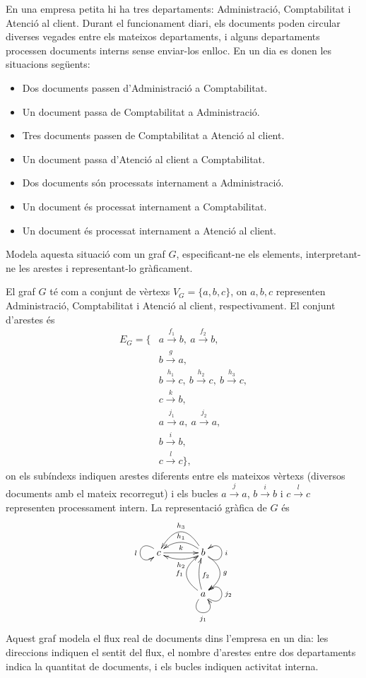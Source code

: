 \begin{exemple}
En una empresa petita hi ha tres departaments: Administració, Comptabilitat i Atenció al client. Durant el funcionament diari, els documents poden circular diverses vegades entre els mateixos departaments, i alguns departaments processen documents interns sense enviar-los enlloc. En un dia es donen les situacions següents:
\begin{itemize}
\item Dos documents passen d'Administració a Comptabilitat.
\item Un document passa de Comptabilitat a Administració.
\item Tres documents passen de Comptabilitat a Atenció al client.
\item Un document passa d'Atenció al client a Comptabilitat.
\item Dos documents són processats internament a Administració.
\item Un document és processat internament a Comptabilitat.
\item Un document és processat internament a Atenció al client.
\end{itemize}
Modela aquesta situació com un graf $G$, especificant-ne els elements, interpretant-ne les arestes i representant-lo gràficament.
\end{exemple}
\begin{solucio}
El graf $G$ té com a conjunt de vèrtexs $V_G=\{a,b,c\}$, on $a,b,c$ representen Administració, Comptabilitat i Atenció al client, respectivament. El conjunt d'arestes és
\[
\begin{aligned}
E_G = \{
& a\xrightarrow{f_1}b,\ a\xrightarrow{f_2}b, \\
& b\xrightarrow{g}a, \\
& b\xrightarrow{h_1}c,\ b\xrightarrow{h_2}c,\ b\xrightarrow{h_3}c, \\
& c\xrightarrow{k}b, \\
& a\xrightarrow{j_1}a,\ a\xrightarrow{j_2}a, \\
& b\xrightarrow{i}b, \\
& c\xrightarrow{l}c
\},
\end{aligned}
\]
on els subíndexs indiquen arestes diferents entre els mateixos vèrtexs (diversos documents amb el mateix recorregut) i els bucles $a\xrightarrow{j}a$, $b\xrightarrow{i}b$ i $c\xrightarrow{l}c$ representen processament intern. La representació gràfica de $G$ és
\[
\xymatrix@R=7ex@C=8ex{
	c \ar@(ul,dl)_l \ar[r]^-{k} & b \ar@/^1.5ex/[l]^-{h_2} \ar@/_2.5ex/[l]_{h_1} \ar@/_5ex/[l]_{h_3}  \ar@(dr,ur)_i \ar@/^4ex/[d]^-{g} \\
	& a \ar@/^4ex/[u]^-{f_1} \ar@/^1ex/[u]_(.45){f_2}  \ar@(dl,dr)_{j_{1}}  \ar@(dr,ur)_{j_{2}}
}
\]
Aquest graf modela el flux real de documents dins l'empresa en un dia: les direccions indiquen el sentit del flux, el nombre d'arestes entre dos departaments indica la quantitat de documents, i els bucles indiquen activitat interna.
\end{solucio}

